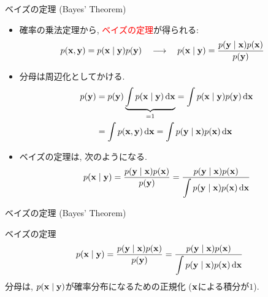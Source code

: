 \documentclass[dvipdfmx,notheorems,t]{beamer}
\begin{document}
\begin{frame}{ベイズの定理 (Bayes' Theorem)}
\begin{itemize}
  \item 確率の乗法定理から, \textcolor{red}{ベイズの定理}が得られる:
  \begin{align*}
    p(\vb{x}, \vb{y}) &= p(\vb{x} \mid \vb{y}) p(\vb{y}) \quad \longrightarrow \quad
    p(\vb{x} \mid \vb{y}) = \frac{p(\vb{y} \mid \vb{x}) p(\vb{x})}{p(\vb{y})}
  \end{align*}
  \item 分母は周辺化としてかける.
  \begin{align*}
    p(\vb{y}) &= p(\vb{y}) \underbrace{\int p(\vb{x} \mid \vb{y}) \dd{\vb{x}}}_{=1}
      = \int p(\vb{x} \mid \vb{y}) p(\vb{y}) \dd{\vb{x}} \\
      &= \int p(\vb{x}, \vb{y}) \dd{\vb{x}}
      = \int p(\vb{y} \mid \vb{x}) p(\vb{x}) \dd{\vb{x}}
  \end{align*}
  \item ベイズの定理は, 次のようになる.
  \begin{align*}
    p(\vb{x} \mid \vb{y}) = \frac{p(\vb{y} \mid \vb{x}) p(\vb{x})}{p(\vb{y})}
      = \frac{p(\vb{y} \mid \vb{x}) p(\vb{x})}{
        \displaystyle \int p(\vb{y} \mid \vb{x}) p(\vb{x}) \dd{\vb{x}}}
  \end{align*}
\end{itemize}
\end{frame}

\begin{frame}{ベイズの定理 (Bayes' Theorem)}
\begin{block}{ベイズの定理}
  \begin{align*}
    p(\vb{x} \mid \vb{y}) = \frac{p(\vb{y} \mid \vb{x}) p(\vb{x})}{p(\vb{y})}
      = \frac{p(\vb{y} \mid \vb{x}) p(\vb{x})}{
        \displaystyle \int p(\vb{y} \mid \vb{x}) p(\vb{x}) \dd{\vb{x}}}
  \end{align*}
  分母は, $p(\vb{x} \mid \vb{y})$が確率分布になるための正規化 ($\vb{x}$による積分が$1$).
\end{block}
\end{frame}
\end{document}
